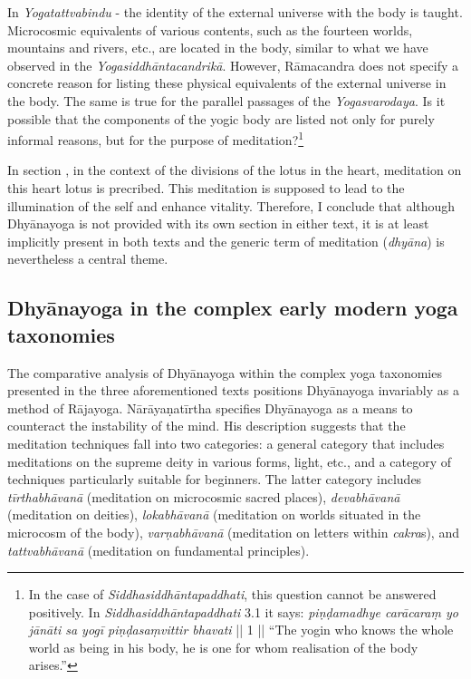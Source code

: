 In \textit{Yogatattvabindu} - the identity of the external universe with the body is taught. Microcosmic equivalents of various contents, such as the fourteen worlds, mountains and rivers, etc., are located in the body, similar to what we have observed in the \textit{Yogasiddhāntacandrikā}. However, Rāmacandra does not specify a concrete reason for listing these physical equivalents of the external universe in the body. The same is true for the parallel passages of the \textit{Yogasvarodaya}. Is it possible that the components of the yogic body are listed not only for purely informal reasons, but for the purpose of meditation?\footnote{In the case of \textit{Siddhasiddhāntapaddhati}, this question cannot be answered positively. In \textit{Siddhasiddhāntapaddhati} 3.1 it says: \textit{piṇḍamadhye carācaraṃ yo jānāti sa yogī piṇḍasaṃvittir bhavati} || 1 || ``The yogin who knows the whole world as being in his body, he is one for whom realisation of the body arises.''} 

In section , in the context of the divisions of the lotus in the heart, meditation on this heart lotus is precribed. This meditation is supposed to lead to the illumination of the self and enhance vitality. Therefore, I conclude that although Dhyānayoga is not provided with its own section in either text, it is at least implicitly present in both texts and the generic term of meditation (\textit{dhyāna}) is nevertheless a central theme. 

\subsection{Dhyānayoga in the complex early modern yoga taxonomies}

The comparative analysis of Dhyānayoga within the complex yoga taxonomies presented in the three aforementioned texts positions Dhyānayoga invariably as a method of Rājayoga. Nārāyaṇatīrtha specifies Dhyānayoga as a means to counteract the instability of the mind. His description suggests that the meditation techniques fall into two categories: a general category that includes meditations on the supreme deity in various forms, light, etc., and a category of techniques particularly suitable for beginners. The latter category includes \textit{tīrthabhāvanā} (meditation on microcosmic sacred places), \textit{devabhāvanā} (meditation on deities), \textit{lokabhāvanā} (meditation on worlds situated in the microcosm of the body), \textit{varṇabhāvanā} (meditation on letters within \textit{cakra}s), and \textit{tattvabhāvanā} (meditation on fundamental principles).

